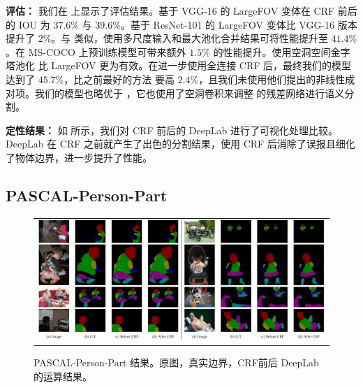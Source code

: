 \textbf{评估：} 
我们在  上显示了评估结果。基于 VGG-16 的 LargeFOV 变体在 CRF 前后的 IOU 为 $37.6\%$ 与 $39.6\%$。基于 ResNet-101 \cite{he2015deep} 的 LargeFOV 变体比 VGG-16 版本提升了 $2\%$。与 \cite{chen2015attention} 类似，使用多尺度输入和最大池化合并结果可将性能提升至 $41.4\%$。在 MS-COCO 上预训练模型可带来额外 $1.5\%$ 的性能提升。使用空洞空间金字塔池化 比 LargeFOV 更为有效。在进一步使用全连接 CRF 后，最终我们的模型达到了 $45.7\%$，比之前最好的方法 \cite{lin2015efficient} 要高 $2.4\%$，且我们未使用他们提出的非线性成对项。我们的模型也略优于 \cite{wu2016bridging}，它也使用了空洞卷积来调整 \cite{he2015deep} 的残差网络进行语义分割。

\textbf{定性结果：} 如  所示，我们对 CRF 前后的 DeepLab 进行了可视化处理比较。DeepLab 在 CRF 之前就产生了出色的分割结果，使用 CRF 后消除了误报且细化了物体边界，进一步提升了性能。

\subsection{PASCAL-Person-Part}
\label{exp:pascal_person_part}

\begin{figure}[!th]
  \centering
  \scalebox{0.9} {
  \begin{tabular}{c}
    \includegraphics[width=1.\linewidth]{fig/voc10_part/results.jpg} \\
  \end{tabular}
  }
  \caption{PASCAL-Person-Part 结果。原图，真实边界，CRF前后 DeepLab 的运算结果。}
  \label{fig:voc10_part_val_results}
\end{figure}

